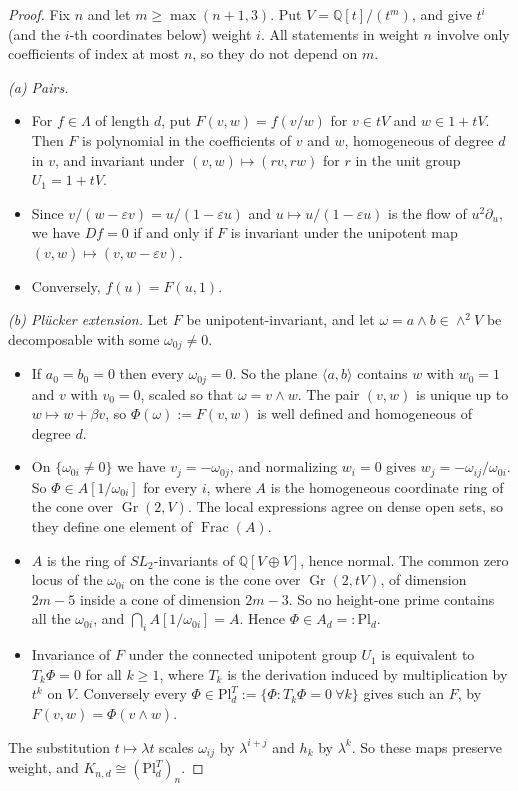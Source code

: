 \documentclass[11pt]{article}
\theoremstyle{definition}
\theoremstyle{remark}
\newcommand{\Q}{\mathbb{Q}}
\newcommand{\La}{\Lambda}
\newcommand{\Pl}{\mathrm{Pl}}
\newcommand{\Gr}{\operatorname{Gr}}
\begin{document}
\begin{proof}
Fix $n$ and let $m\ge\max(n+1,3)$. Put $V=\Q[t]/(t^m)$, and give $t^i$ (and the $i$-th coordinates below) weight
$i$. All statements in weight $n$ involve only coefficients of index at most $n$, so they do not depend on $m$.

\emph{(a) Pairs.}
\begin{itemize}
\item For $f\in\La$ of length $d$, put $F(v,w)=f(v/w)$ for $v\in tV$ and $w\in1+tV$. Then $F$ is polynomial in the
coefficients of $v$ and $w$, homogeneous of degree $d$ in $v$, and invariant under $(v,w)\mapsto(rv,rw)$ for $r$
in the unit group $U_1=1+tV$.
\item Since $v/(w-\varepsilon v)=u/(1-\varepsilon u)$ and $u\mapsto u/(1-\varepsilon u)$ is the flow of
$u^2\partial_u$, we have $Df=0$ if and only if $F$ is invariant under the unipotent map
$(v,w)\mapsto(v,w-\varepsilon v)$.
\item Conversely, $f(u)=F(u,1)$.
\end{itemize}

\emph{(b) Pl\"ucker extension.} Let $F$ be unipotent-invariant, and let $\omega=a\wedge b\in\wedge^2V$ be
decomposable with some $\omega_{0j}\ne0$.
\begin{itemize}
\item If $a_0=b_0=0$ then every $\omega_{0j}=0$. So the plane $\langle a,b\rangle$ contains $w$ with $w_0=1$
and $v$ with $v_0=0$, scaled so that $\omega=v\wedge w$. The pair $(v,w)$ is unique up to $w\mapsto w+\beta v$,
so $\Phi(\omega):=F(v,w)$ is well defined and homogeneous of degree $d$.
\item On $\{\omega_{0i}\ne0\}$ we have $v_j=-\omega_{0j}$, and normalizing $w_i=0$ gives
$w_j=-\omega_{ij}/\omega_{0i}$. So $\Phi\in A[1/\omega_{0i}]$ for every $i$, where $A$ is the homogeneous
coordinate ring of the cone over $\Gr(2,V)$. The local expressions agree on dense open sets, so they define one
element of $\operatorname{Frac}(A)$.
\item $A$ is the ring of $SL_2$-invariants of $\Q[V\oplus V]$, hence normal. The common zero locus of the
$\omega_{0i}$ on the cone is the cone over $\Gr(2,tV)$, of dimension $2m-5$ inside a cone of dimension $2m-3$. So
no height-one prime contains all the $\omega_{0i}$, and $\bigcap_iA[1/\omega_{0i}]=A$. Hence $\Phi\in A_d=:\Pl_d$.
\item Invariance of $F$ under the connected unipotent group $U_1$ is equivalent to $T_k\Phi=0$ for all $k\ge1$,
where $T_k$ is the derivation induced by multiplication by $t^k$ on $V$. Conversely every
$\Phi\in\Pl_d^T:=\{\Phi:T_k\Phi=0\ \forall k\}$ gives such an $F$, by $F(v,w)=\Phi(v\wedge w)$.
\end{itemize}
The substitution $t\mapsto\lambda t$ scales $\omega_{ij}$ by $\lambda^{i+j}$ and $h_k$ by $\lambda^k$. So these
maps preserve weight, and $K_{n,d}\cong(\Pl_d^T)_n$.


\end{proof}
\end{document}
